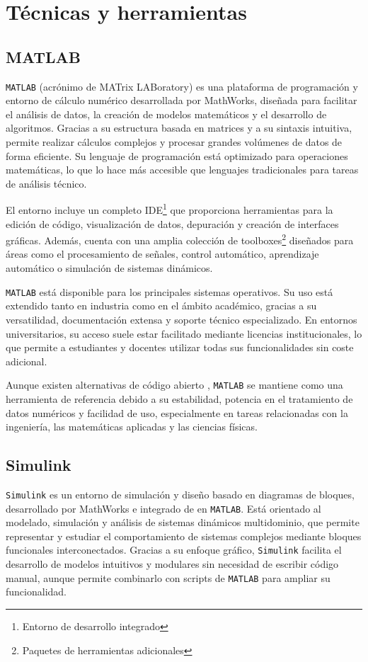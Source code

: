 \section{Técnicas y herramientas}

\subsection{MATLAB}
\texttt{MATLAB} (acrónimo de MATrix LABoratory) \cite{mathworks_matlab} es una plataforma de programación y entorno de cálculo numérico desarrollada por MathWorks, diseñada para facilitar el análisis de datos, la creación de modelos matemáticos y el desarrollo de algoritmos. Gracias a su estructura basada en matrices y a su sintaxis intuitiva, permite realizar cálculos complejos y procesar grandes volúmenes de datos de forma eficiente. Su lenguaje de programación está optimizado para operaciones matemáticas, lo que lo hace más accesible que lenguajes tradicionales para tareas de análisis técnico.

El entorno incluye un completo IDE\footnote{Entorno de desarrollo integrado} que proporciona herramientas para la edición de código, visualización de datos, depuración y creación de interfaces gráficas. Además, cuenta con una amplia colección de toolboxes\footnote{Paquetes de herramientas adicionales} diseñados para áreas como el procesamiento de señales, control automático, aprendizaje automático o simulación de sistemas dinámicos.

\texttt{MATLAB} está disponible para los principales sistemas operativos. Su uso está extendido tanto en industria como en el ámbito académico, gracias a su versatilidad, documentación extensa y soporte técnico especializado. En entornos universitarios, su acceso suele estar facilitado mediante licencias institucionales, lo que permite a estudiantes y docentes utilizar todas sus funcionalidades sin coste adicional.

Aunque existen alternativas de código abierto , \texttt{MATLAB} se mantiene como una herramienta de referencia debido a su estabilidad, potencia en el tratamiento de datos numéricos y facilidad de uso, especialmente en tareas relacionadas con la ingeniería, las matemáticas aplicadas y las ciencias físicas.

\subsection{Simulink}
\texttt{Simulink} \cite{mathworks_simulink} es un entorno de simulación y diseño basado en diagramas de bloques, desarrollado por MathWorks e integrado de en \texttt{MATLAB}. Está orientado al modelado, simulación y análisis de sistemas dinámicos multidominio, que permite representar y estudiar el comportamiento de sistemas complejos mediante bloques funcionales interconectados. Gracias a su enfoque gráfico, \texttt{Simulink} facilita el desarrollo de modelos intuitivos y modulares sin necesidad de escribir código manual, aunque permite combinarlo con scripts de \texttt{MATLAB} para ampliar su funcionalidad.

